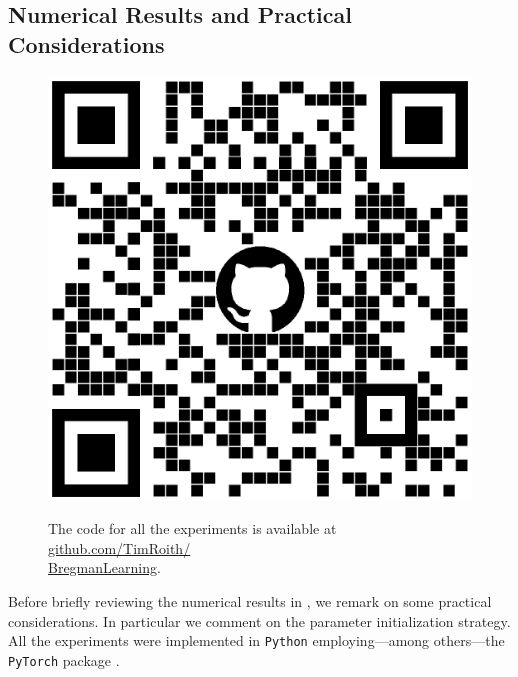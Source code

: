 \subsection{Numerical Results and Practical Considerations}\label{sec:Bregnum}
%
%
\begin{figure}
\begin{center}
\includegraphics[width=.4\textwidth]{atelier/Breg_dist/BregQR.png}
\end{center}
The code for all the experiments is available at \href{https://github.com/TimRoith/BregmanLearning}{github.com/TimRoith/}\\
\href{https://github.com/TimRoith/BregmanLearning}{BregmanLearning}.
\end{figure}
Before briefly reviewing the numerical results in \cite[Sec. 4]{bungert2022bregman}, we remark on some practical considerations. In particular we comment on the parameter initialization strategy. All the experiments were implemented in \texttt{Python} \cite{van1995python} employing---among others---the \texttt{PyTorch} package \cite{paszke2019pytorch}.
%
